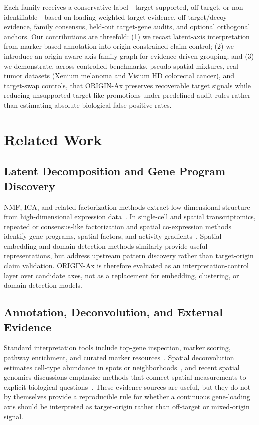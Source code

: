 \documentclass[conference]{IEEEtran}
\begin{document}
Each family receives a conservative label---target-supported, off-target, or non-identifiable---based on loading-weighted target evidence, off-target/decoy evidence, family consensus, held-out target-gene audits, and optional orthogonal anchors. Our contributions are threefold: (1) we recast latent-axis interpretation from marker-based annotation into origin-constrained claim control; (2) we introduce an origin-aware axis-family graph for evidence-driven grouping; and (3) we demonstrate, across controlled benchmarks, pseudo-spatial mixtures, real tumor datasets (Xenium melanoma and Visium HD colorectal cancer), and target-swap controls, that ORIGIN-Ax preserves recoverable target signals while reducing unsupported target-like promotions under predefined audit rules rather than estimating absolute biological false-positive rates.

\section{Related Work}

\subsection{Latent Decomposition and Gene Program Discovery}

NMF, ICA, and related factorization methods extract low-dimensional structure
from high-dimensional expression data~\cite{lee1999learning,hyvarinen2000ica}.
In single-cell and spatial transcriptomics, repeated or consensus-like
factorization and spatial co-expression methods identify gene programs,
spatial factors, and activity gradients~\cite{kotliar2019cnmf,higgins2025stihc}.
Spatial embedding and domain-detection methods similarly provide useful
representations, but address upstream pattern discovery rather than
target-origin claim validation. ORIGIN-Ax is therefore evaluated as an
interpretation-control layer over candidate axes, not as a replacement for
embedding, clustering, or domain-detection models.

\subsection{Annotation, Deconvolution, and External Evidence}

Standard interpretation tools include top-gene inspection, marker scoring,
pathway enrichment, and curated marker resources~\cite{subramanian2005gsea,zhang2019cellmarker}.
Spatial deconvolution estimates cell-type abundance in spots or
neighborhoods~\cite{kleshchevnikov2022cell2location,cable2022rctd}, and recent
spatial genomics discussions emphasize methods that connect spatial
measurements to explicit biological questions~\cite{jena2024openquestions}.
These evidence sources are useful, but they do not by themselves provide a
reproducible rule for whether a continuous gene-loading axis should be
interpreted as target-origin rather than off-target or mixed-origin signal.
\end{document}
